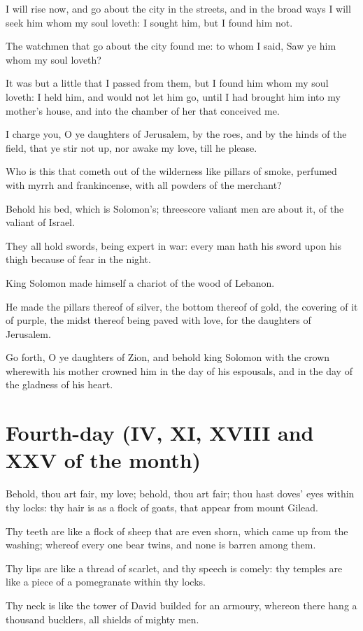 \documentclass[0main.tex]{subfiles}
\begin{document}
I will rise now, and go about the city in the streets, and in the broad ways I will seek him whom my soul loveth: I sought him, but I found him not.

The watchmen that go about the city found me: to whom I said, Saw ye him whom my soul loveth?

It was but a little that I passed from them, but I found him whom my soul loveth: I held him, and would not let him go, until I had brought him into my mother's house, and into the chamber of her that conceived me.

I charge you, O ye daughters of Jerusalem, by the roes, and by the hinds of the field, that ye stir not up, nor awake my love, till he please.

Who is this that cometh out of the wilderness like pillars of smoke, perfumed with myrrh and frankincense, with all powders of the merchant?

Behold his bed, which is Solomon's; threescore valiant men are about it, of the valiant of Israel.

They all hold swords, being expert in war: every man hath his sword upon his thigh because of fear in the night.

King Solomon made himself a chariot of the wood of Lebanon.

He made the pillars thereof of silver, the bottom thereof of gold, the covering of it of purple, the midst thereof being paved with love, for the daughters of Jerusalem.

Go forth, O ye daughters of Zion, and behold king Solomon with the crown wherewith his mother crowned him in the day of his espousals, and in the day of the gladness of his heart.

\section*{Fourth-day (IV, XI, XVIII and XXV of the month)}

Behold, thou art fair, my love; behold, thou art fair; thou hast doves' eyes within thy locks: thy hair is as a flock of goats, that appear from mount Gilead.

Thy teeth are like a flock of sheep that are even shorn, which came up from the washing; whereof every one bear twins, and none is barren among them.

Thy lips are like a thread of scarlet, and thy speech is comely: thy temples are like a piece of a pomegranate within thy locks.

Thy neck is like the tower of David builded for an armoury, whereon there hang a thousand bucklers, all shields of mighty men.
\end{document}
